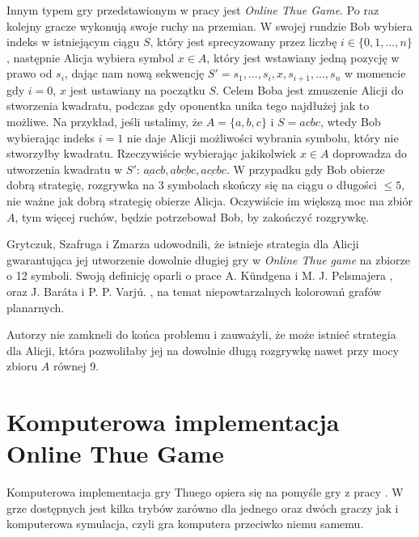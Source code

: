 \documentclass[document]{xmgr}
\begin{document}
Innym typem gry przedstawionym w pracy \cite{thueonline} jest \emph{Online Thue Game}. Po raz kolejny gracze wykonują swoje ruchy na przemian. W swojej rundzie Bob wybiera indeks w istniejącym ciągu $S$, który jest sprecyzowany przez liczbę $i \in \{0, 1, ..., n\}$, następnie Alicja wybiera symbol $x \in A$, który jest wstawiany jedną pozycję w prawo od $s_i$, dając nam nową sekwencję $S' = s_1, ..., s_i, x, s_{i+1}, ...,s_n$ w momencie gdy $i = 0$, $x$ jest ustawiany na początku $S$. Celem Boba jest zmuszenie Alicji do stworzenia kwadratu, podczas gdy oponentka unika tego najdłużej jak to możliwe. Na przykład, jeśli ustalimy, że $A = \{a, b, c\}$ i $S = acbc$, wtedy Bob wybierając indeks $i = 1$ nie daje Alicji możliwości wybrania symbolu, który nie stworzyłby kwadratu. Rzeczywiście wybierając jakikolwiek $x \in A$ doprowadza do utworzenia kwadratu w $S'$: $\underline{aa}cb, a\underline{bcbc}, a\underline{cc}bc$. W przypadku gdy Bob obierze dobrą strategię, rozgrywka na 3 symbolach skończy się na ciągu o długości $\leq 5$, nie ważne jak dobrą strategię obierze Alicja. Oczywiście im większą moc ma zbiór $A$, tym więcej ruchów, będzie potrzebował Bob, by zakończyć rozgrywkę. 

Grytczuk, Szafruga i Zmarza \cite{thueonline} udowodnili, że istnieje strategia dla Alicji gwarantująca jej utworzenie dowolnie długiej gry w \emph{Online Thue game} na zbiorze o 12 symboli. Swoją definicję oparli o prace A. Kündgena i M. J. Pelsmajera \cite{first}, oraz J. Baráta i P. P. Varjú. \cite{second}, na temat niepowtarzalnych kolorowań grafów planarnych.

Autorzy \cite{thueonline} nie zamkneli do końca problemu i zauważyli, że może istnieć strategia dla Alicji, która pozwoliłaby jej na dowolnie długą rozgrywkę nawet przy mocy zbioru $A$ równej 9.


\section{Komputerowa implementacja Online Thue Game}

Komputerowa implementacja gry Thuego opiera się na pomyśle gry z pracy \cite{thueonline}. W grze dostępnych jest kilka trybów zarówno dla jednego oraz dwóch graczy jak i komputerowa symulacja, czyli gra komputera przeciwko niemu samemu.
\end{document}
